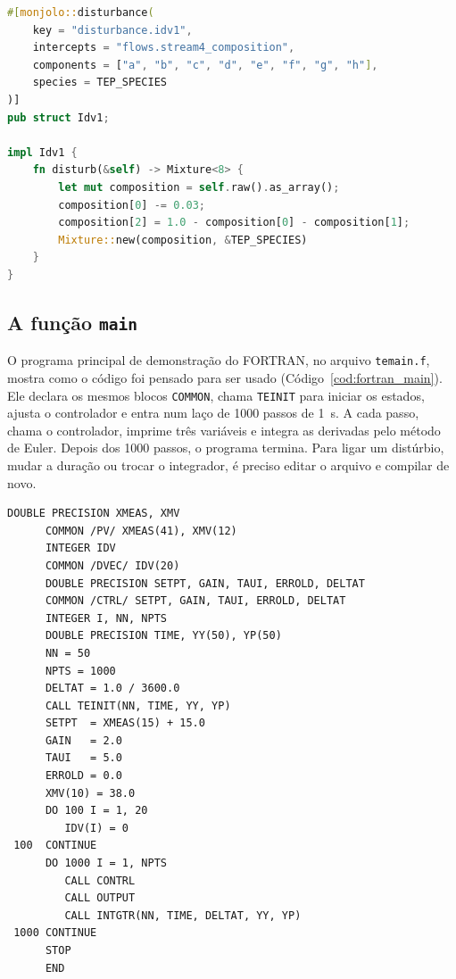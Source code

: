 \noindent\begin{minipage}{\linewidth}
\begin{lstlisting}[language=Rust, caption={O distúrbio IDV(1) no \texttt{tep-plant}}, label={cod:rust_idv1}]
#[monjolo::disturbance(
    key = "disturbance.idv1",
    intercepts = "flows.stream4_composition",
    components = ["a", "b", "c", "d", "e", "f", "g", "h"],
    species = TEP_SPECIES
)]
pub struct Idv1;

impl Idv1 {
    fn disturb(&self) -> Mixture<8> {
        let mut composition = self.raw().as_array();
        composition[0] -= 0.03;
        composition[2] = 1.0 - composition[0] - composition[1];
        Mixture::new(composition, &TEP_SPECIES)
    }
}
\end{lstlisting}
\end{minipage}

\subsection{A função \texttt{main}}
\label{subsec:main}

O programa principal de demonstração do FORTRAN, no arquivo \texttt{temain.f}, mostra como o código foi pensado para ser usado (Código~\ref{cod:fortran_main}). Ele declara os mesmos blocos \texttt{COMMON}, chama \texttt{TEINIT} para iniciar os estados, ajusta o controlador e entra num laço de 1000 passos de 1~s. A cada passo, chama o controlador, imprime três variáveis e integra as derivadas pelo método de Euler. Depois dos 1000 passos, o programa termina. Para ligar um distúrbio, mudar a duração ou trocar o integrador, é preciso editar o arquivo e compilar de novo.

\noindent\begin{minipage}{\linewidth}
\begin{lstlisting}[language={[77]Fortran}, caption={Programa principal de demonstração do FORTRAN}, label={cod:fortran_main}]
      DOUBLE PRECISION XMEAS, XMV
      COMMON /PV/ XMEAS(41), XMV(12)
      INTEGER IDV
      COMMON /DVEC/ IDV(20)
      DOUBLE PRECISION SETPT, GAIN, TAUI, ERROLD, DELTAT
      COMMON /CTRL/ SETPT, GAIN, TAUI, ERROLD, DELTAT
      INTEGER I, NN, NPTS
      DOUBLE PRECISION TIME, YY(50), YP(50)
      NN = 50
      NPTS = 1000
      DELTAT = 1.0 / 3600.0
      CALL TEINIT(NN, TIME, YY, YP)
      SETPT  = XMEAS(15) + 15.0
      GAIN   = 2.0
      TAUI   = 5.0
      ERROLD = 0.0
      XMV(10) = 38.0
      DO 100 I = 1, 20
         IDV(I) = 0
 100  CONTINUE
      DO 1000 I = 1, NPTS
         CALL CONTRL
         CALL OUTPUT
         CALL INTGTR(NN, TIME, DELTAT, YY, YP)
 1000 CONTINUE
      STOP
      END
\end{lstlisting}
\end{minipage}

